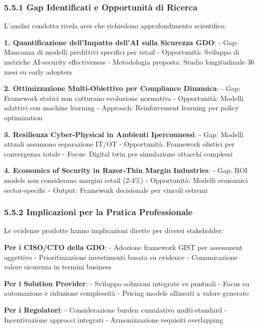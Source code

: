 \documentclass{report}
\begin{document}
\subsubsection{5.5.1 Gap Identificati e Opportunità di
Ricerca}\label{gap-identificati-e-opportunituxe0-di-ricerca}

L'analisi condotta rivela aree che richiedono approfondimento
scientifico:

\textbf{1. Quantificazione dell'Impatto dell'AI sulla Sicurezza GDO}: -
Gap: Mancanza di modelli predittivi specifici per retail - Opportunità:
Sviluppo di metriche AI-security effectiveness - Metodologia proposta:
Studio longitudinale 36 mesi su early adopters

\textbf{2. Ottimizzazione Multi-Obiettivo per Compliance Dinamica}: -
Gap: Framework statici non catturano evoluzione normativa - Opportunità:
Modelli adattivi con machine learning - Approach: Reinforcement learning
per policy optimization

\textbf{3. Resilienza Cyber-Physical in Ambienti Iperconnessi}: - Gap:
Modelli attuali assumono separazione IT/OT - Opportunità: Framework
olistici per convergenza totale - Focus: Digital twin per simulazione
attacchi complessi

\textbf{4. Economics of Security in Razor-Thin Margin Industries}: -
Gap: ROI models non considerano margini retail (2-4\%) - Opportunità:
Modelli economici sector-specific - Output: Framework decisionale per
vincoli estremi

\subsubsection{5.5.2 Implicazioni per la Pratica
Professionale}\label{implicazioni-per-la-pratica-professionale}

Le evidenze prodotte hanno implicazioni dirette per diversi stakeholder:

\textbf{Per i CISO/CTO della GDO}: - Adozione framework GIST per
assessment oggettivo - Prioritizzazione investimenti basata su evidence
- Comunicazione valore sicurezza in termini business

\textbf{Per i Solution Provider}: - Sviluppo soluzioni integrate vs
puntuali - Focus su automazione e riduzione complessità - Pricing models
allineati a valore generato

\textbf{Per i Regolatori}: - Considerazione burden cumulativo
multi-standard - Incentivazione approcci integrati - Armonizzazione
requisiti overlapping
\end{document}
